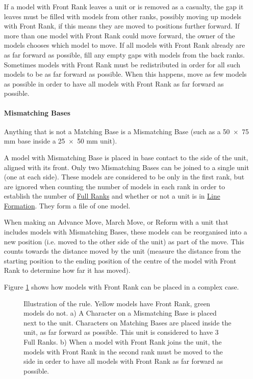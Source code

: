 If a model with Front Rank leaves a unit or is removed as a casualty, the gap it leaves must be filled with models from other ranks, possibly moving up models with Front Rank, if this means they are moved to positions further forward. If more than one model with Front Rank could move forward, the owner of the models chooses which model to move. If all models with Front Rank already are as far forward as possible, fill any empty gaps with \rnf{} models from the back ranks. Sometimes models with Front Rank must be redistributed in order for all such models to be as far forward as possible. When this happens, move as few models as possible in order to have all models with Front Rank as far forward as possible.

\paragraph{Mismatching Bases}
\label{mismatching_bases}

Anything that is not a Matching Base is a Mismatching Base (such as a \num{50x75} \si{\milli\meter} base inside a \num{25x50} \si{\milli\meter} unit).

A model with Mismatching Base is placed in base contact to the side of the unit, aligned with its front. Only two Mismatching Bases can be joined to a single unit (one at each side). These models are considered to be only in the first rank, but are ignored when counting the number of models in each rank in order to establish the number of \hyperref[full_ranks]{Full Ranks} and whether or not a unit is in \hyperref[line_formation]{Line Formation}. They form a file of one model.

When making an Advance Move, March Move, or Reform with a unit that includes models with Mismatching Bases, these models can be reorganised into a new position (i.e. moved to the other side of the unit) as part of the move. This counts towards the distance moved by the unit (measure the distance from the starting position to the ending position of the centre of the model with Front Rank to determine how far it has moved).

Figure \ref{figure/front_rank} shows how models with Front Rank can be placed in a complex case.

\newcommand{\figFRA}{a)}
\newcommand{\figFRB}{b)}

\begin{figure}[!htbp]
\centering
\def\svgwidth{0.6\textwidth}

\caption{Illustration of the \frontrank{} rule.\captionpar
Yellow models have Front Rank, green models do not.\captionpar
a) A Character on a Mismatching Base is placed next to the unit. Characters on Matching Bases are placed inside the unit, as far forward as possible. This unit is considered to have 3 Full Ranks.\captionpar
b) When a model with Front Rank joins the unit, the models with Front Rank in the second rank must be moved to the side in order to have all models with Front Rank as far forward as possible.
}
\label{figure/front_rank}
\end{figure}

